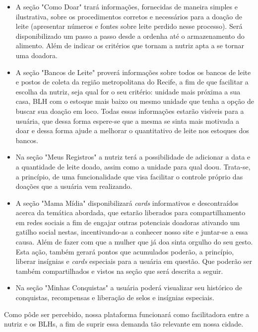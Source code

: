 \begin{itemize}
    \item A seção "Como Doar" trará informações, fornecidas de maneira simples e ilustrativa, sobre os procedimentos corretos e necessários para a doação de leite (apresentar números e fontes sobre leite perdido nesse processo). Será disponibilizado um passo a passo desde a ordenha até o armazenamento do alimento. Além de indicar os critérios que tornam a nutriz apta a se tornar uma doadora.
    \item A seção "Bancos de Leite" proverá informações sobre todos os bancos de leite e postos de coleta da região metropolitana do Recife, a fim de que facilitar a escolha da nutriz, seja qual for o seu critério: unidade mais próxima a sua casa, BLH com o estoque mais baixo ou mesmo unidade que tenha a opção de buscar sua doação em loco. Todas essas informações estarão visíveis para a usuária, que dessa forma espere-se que a mesma se sinta mais motivada a doar e dessa forma ajude a melhorar o quantitativo de leite nos estoques dos bancos.
    \item Na seção "Meus Registros" a nutriz terá a possibilidade de adicionar a data e a quantidade de leite doado, assim como a unidade para qual doou. Trata-se, a princípio, de uma funcionalidade que visa facilitar o controle próprio das doações que a usuária vem realizando.
    \item A seção "Mama Mídia" disponibilizará \textit{cards} informativos e descontraídos acerca da temática abordada, que estarão liberados para compartilhamento em redes sociais a fim de engajar outras potenciais doadoras ativando um gatilho social nestas, incentivando-as a conhecer nosso site e juntar-se a essa causa. Além de fazer com que a mulher que já doa sinta orgulho do seu gesto. Esta ação, também gerará pontos que acumulados poderão, a princípio, liberar insígnias e \textit{cards} especiais para a usuária em questão. Que poderão ser também compartilhados e vistos na seção que será descrita a seguir.
    \item Na seção "Minhas Conquistas" a usuária poderá visualizar seu histórico de conquistas, recompensas e liberação de selos e insígnias especiais.
\end{itemize}


Como pôde ser percebido, nossa plataforma funcionará como facilitadora entre a nutriz e os BLHs, a fim de suprir essa demanda tão relevante em nossa cidade. 

